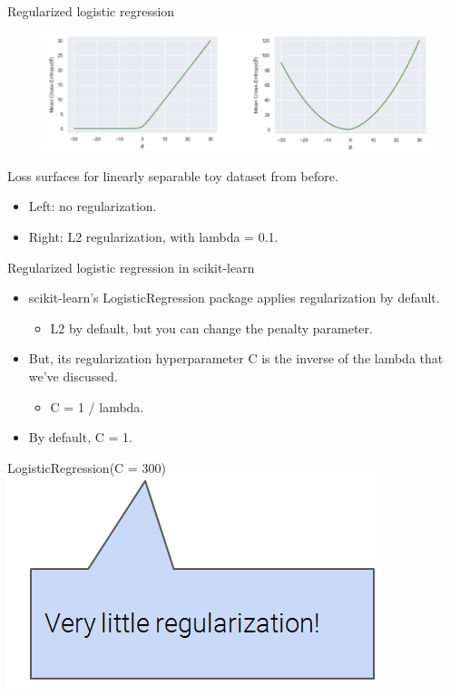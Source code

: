 \documentclass[aspectratio=169]{../latex_main/tntbeamer}  %
\begin{document}
	 
	 \begin{frame}{Regularized logistic regression}
	    \begin{figure}
	        \centering
	        \includegraphics[scale=.4]{Bild47}
	    \end{figure}
	     Loss surfaces for linearly separable toy dataset from before.
	     \begin{itemize}
	         \item Left: no regularization.
	         \item Right: L2 regularization, with lambda = 0.1.
	     \end{itemize}
	 \end{frame}
	 
	 
	 \begin{frame}{Regularized logistic regression in scikit-learn}
	    \begin{itemize}
	        \item scikit-learn’s LogisticRegression package applies regularization by default.
	        \begin{itemize}
	            \item L2 by default, but you can change the penalty parameter.
	        \end{itemize}
	        \item But, its regularization hyperparameter C is the inverse of the lambda that we’ve discussed.
	        \begin{itemize}
	            \item C = 1 / lambda.
	        \end{itemize}
	        \item By default, C = 1.
	    \end{itemize}
	    

	   \bigskip
	   LogisticRegression(C = 300)\\
	   \includegraphics[scale=.5]{Bild48}
	 \end{frame}
\end{document}
